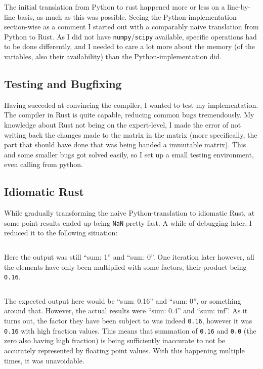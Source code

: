 
The initial translation from Python to rust happened more or less on a
line-by-line basis, as much as this was possible. Seeing the
Python-implementation section-wise as a comment I started out with a comparably
naive translation from Python to Rust. As I did not have
\verb|numpy|/\verb|scipy| available, specific operations had to be done
differently, and I needed to care a lot more about the memory (of the
variables, also their availability) than the Python-implementation did.


\subsection{Testing and Bugfixing}



Having succeded at convincing the compiler, I wanted to test my implementation.
The compiler in Rust is quite capable, reducing common bugs tremendously.
My knowledge about Rust not being on the expert-level, I made the error of not
writing back the changes made to the matrix in the matrix (more specifically,
the part that should have done that was being handed a immutable matrix). This
and some smaller bugs got solved easily, so I set up a small testing
environment, even calling from python.


\subsection{Idiomatic Rust}


While gradually transforming the naive Python-translation to idiomatic Rust, at
some point results ended up being \verb|NaN| pretty fast. A while of
debugging later, I reduced it to the following situation:


\inputminted{Rust}{code_infsum1.rs}

Here the output was still ``sum: 1'' and ``sum: 0''. One iteration later however, all the elements have only been multiplied with some factors, their product being \verb|0.16|.

\inputminted{Rust}{code_infsum2.rs}

The expected output here would be ``sum: 0.16'' and ``sum: 0'', or something
around that. However, the actual results were ``sum: 0.4'' and ``sum: inf''. As
it turns out, the factor they have been subject to was indeed \verb|0.16|,
however it was \verb|0.16| with high fraction values. This means that summation
of \verb|0.16| and \verb|0.0| (the zero also having high fraction) is being
sufficiently inaccurate to not be accurately represented by floating point
values. With this happening multiple times, it was unavoidable.

